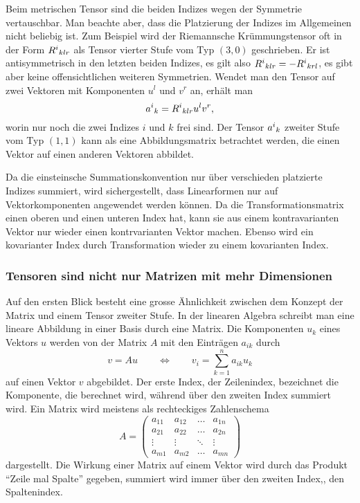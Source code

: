 Beim metrischen Tensor sind die beiden Indizes wegen der Symmetrie
vertauschbar.
Man beachte aber, dass die Platzierung der Indizes im Allgemeinen nicht
beliebig ist.
Zum Beispiel wird der Riemannsche Krümmungstensor oft in der Form
\(
R^i\mathstrut_{klr}
\)
als Tensor vierter Stufe vom Typ $(3,0)$ geschrieben.
Er ist antisymmetrisch in den letzten beiden Indizes, es gilt also
\(
R^i\mathstrut_{klr}
=
-
R^i\mathstrut_{krl}
\),
es gibt aber keine offensichtlichen weiteren Symmetrien.
Wendet man den Tensor auf zwei Vektoren mit Komponenten $u^l$ und
$v^r$ an, erhält man
\[
a^i\mathstrut_k
=
R^i\mathstrut_{klr}u^lv^r,
\]
worin nur noch die zwei Indizes $i$ und $k$ frei sind.
Der Tensor $a^i\mathstrut_k$ zweiter Stufe vom Typ $(1,1)$
kann als eine Abbildungsmatrix betrachtet werden,
die einen Vektor auf einen anderen Vektoren abbildet.

Da die einsteinsche Summationskonvention nur über verschieden platzierte
Indizes summiert, wird sichergestellt, dass Linearformen nur auf
Vektorkomponenten angewendet werden können.
Da die Transformationsmatrix einen oberen und einen unteren Index hat,
kann sie aus einem kontravarianten Vektor nur wieder einen kontrvarianten
Vektor machen.
Ebenso wird ein kovarianter Index durch Transformation wieder zu einem
kovarianten Index.

%
%
\subsubsection{Tensoren sind nicht nur Matrizen mit mehr Dimensionen}
Auf den ersten Blick besteht eine grosse Ähnlichkeit zwischen dem
Konzept der Matrix und einem Tensor zweiter Stufe.
In der linearen Algebra schreibt man eine lineare Abbildung in einer
Basis durch eine Matrix.
Die Komponenten $u_k$ eines Vektors $u$ werden von der Matrix $A$
mit den Einträgen $a_{ik}$ durch
\[
v = Au
\qquad\Leftrightarrow\qquad
v_i = \sum_{k=1}^n a_{ik}u_k
\]
auf einen Vektor $v$ abgebildet.
Der erste Index, der Zeilenindex, bezeichnet die Komponente, die berechnet
wird, während über den zweiten Index summiert wird.
Ein Matrix wird meistens als rechteckiges Zahlenschema
\[
A
=
\begin{pmatrix}
a_{11} & a_{12} & \dots  & a_{1n} \\
a_{21} & a_{22} & \dots  & a_{2n} \\[-2pt]
\vdots & \vdots & \ddots & \vdots \\[-1pt]
a_{m1} & a_{m2} & \dots  & a_{mn}
\end{pmatrix}
\]
dargestellt.
Die Wirkung einer Matrix auf einem Vektor wird durch das Produkt
``Zeile mal Spalte'' gegeben, summiert wird immer über den zweiten
Index,, den Spaltenindex.

